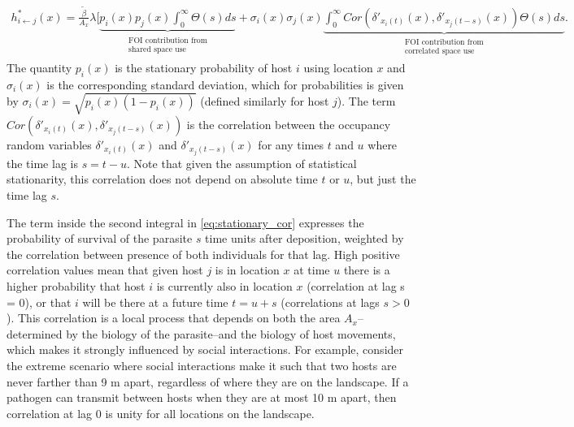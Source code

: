 \documentclass[letterpaper]{article}
\begin{document}
\begin{equation}
    \begin{aligned}
    h^*_{i \leftarrow j}(x) = \frac{\tilde\beta}{A_x} \lambda [ \underbrace{p_i(x)p_j(x) \int_{0}^{\infty}\Theta(s) ds}_{\substack{\text{FOI contribution from} \\ \text{shared space use}}} + \sigma_i(x) \sigma_j(x) \underbrace{\int_{0}^{\infty} Cor(\delta'_{x_i(t)}(x), \delta'_{x_j(t - s)}(x)) \Theta(s) ds}_{\substack{\text{FOI contribution from} \\ \text{correlated space use}}}.
    \end{aligned}
    \label{eq:stationary_cor}
\end{equation}
The quantity $p_i(x)$ is the stationary probability of host $i$ using location $x$ and $\sigma_i(x)$ is the corresponding standard deviation, which for probabilities is given by $\sigma_i(x)= \sqrt{p_i(x)(1 - p_i(x))}$ (defined similarly for host $j$). The term $Cor(\delta'_{x_i(t)}(x), \delta'_{x_j(t - s)}(x))$ is the correlation between the occupancy random variables $\delta'_{x_i(t)}(x)$ and $\delta'_{x_j(t - s)}(x)$ for any times $t$ and $u$ where the time lag is $s = t-u$.  %
Note that given the assumption of statistical stationarity, this correlation does not depend on absolute time $t$ or $u$, but just the time lag $s$.  

The term inside the second integral in \ref{eq:stationary_cor} expresses the probability of survival of the parasite $s$ time units after deposition, weighted by the correlation between presence of both individuals for that lag. High positive correlation values mean that given host $j$ is in location $x$ at time $u$ there is a higher probability that host $i$ is currently also in location $x$ (correlation at lag s = 0), or that $i$ will be there at a future time $t = u+s$ (correlations at lags $s > 0$). This correlation is a local process that depends on both the area $A_x$--determined by the biology of the parasite--and the biology of host movements, which makes it strongly influenced by social interactions. For example, consider the extreme scenario where social interactions make it such that two hosts are never farther than 9 m apart, regardless of where they are on the landscape. If a pathogen can transmit between hosts when they are at most 10 m apart, then correlation at lag 0 is unity for all locations on the landscape. 
\end{document}
